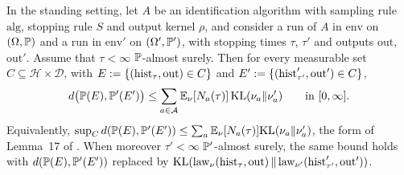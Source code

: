 \begin{theorem}\label{thm:change_of_measure}
\leanok
{}
In the standing setting, let $A$ be an identification algorithm with sampling rule
$\mathrm{alg}$, stopping rule $S$ and output kernel $\rho$, and consider a run of $A$ in
$\mathrm{env}$ on $(\Omega,\mathbb{P})$ and a run in $\mathrm{env}'$ on $(\Omega',\mathbb{P}')$, with
stopping times $\tau$, $\tau'$ and outputs $\mathrm{out}$, $\mathrm{out}'$. Assume that
$\tau < \infty$ $\mathbb{P}$-almost surely. Then for every measurable set $C \subseteq \mathcal H\times\mathcal D$,
with $E := \{(\mathrm{hist}_\tau, \mathrm{out}) \in C\}$ and $E' := \{(\mathrm{hist}'_{\tau'}, \mathrm{out}') \in C\}$,
\[
  d\big(\mathbb{P}(E), \mathbb{P}'(E')\big) \le \sum_{a\in\mathcal{A}}\mathbb{E}_\nu[N_a(\tau)]\,\mathrm{KL}(\nu_a\|\nu'_a)
  \qquad\text{in } [0, \infty].
\]
Equivalently, $\sup_C d(\mathbb{P}(E), \mathbb{P}'(E')) \le \sum_a \mathbb{E}_\nu[N_a(\tau)]\mathrm{KL}(\nu_a\|\nu'_a)$,
the form of Lemma~17 of \cite{essakine2026tight}. When moreover $\tau' < \infty$
$\mathbb{P}'$-almost surely, the same bound holds with $d(\mathbb{P}(E), \mathbb{P}'(E'))$ replaced by
$\mathrm{KL}(\mathrm{law}_\nu(\mathrm{hist}_\tau,\mathrm{out})\,\|\,\mathrm{law}_{\nu'}(\mathrm{hist}'_{\tau'},\mathrm{out}'))$.
\end{theorem}

